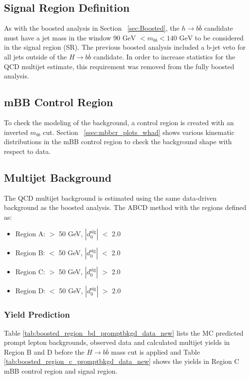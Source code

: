 \subsection{Signal Region Definition}
As with the boosted analysis in Section ~\ref{sec:Boosted}, the ${h\rightarrow b\overline{b}}$ candidate must have a jet mass in the window ${90 \text{ GeV } < m_{bb} < 140 \text{ GeV}}$ to be considered in the signal region (SR). The previous boosted analysis included a b-jet veto for all jets outside of the ${H\rightarrow b\overline{b}}$ candidate. In order to increase statistics for the QCD multijet estimate, this requirement was removed from the fully boosted analysis.

\subsection{mBB Control Region}
To check the modeling of the background, a control region is created with an inverted ${m_{bb}}$ cut. Section ~\ref{ssec:mbbcr_plots_whad} shows various kinematic distributions in  the mBB control region to check the background shape with respect to data.
\subsection{Multijet Background}
The QCD multijet background is estimated using the same data-driven background as the boosted analysis. The ABCD method with the regions defined as:
\begin{itemize}
\item Region A: \met $>$ 50 GeV, $|d_{0}^{\textrm{sig}}|$ $<$ 2.0
\item Region B: \met $<$ 50 GeV, $|d_{0}^{\textrm{sig}}|$ $<$ 2.0
\item Region C: \met $>$ 50 GeV, $|d_{0}^{\textrm{sig}}|$ $>$ 2.0
\item Region D: \met $<$ 50 GeV, $|d_{0}^{\textrm{sig}}|$ $>$ 2.0
\end{itemize}

\subsubsection{Yield Prediction}
Table \ref{tab:boosted_region_bd_promptbkgd_data_new} lists the MC predicted prompt lepton backgrounds, observed data and calculated multijet yields in Region B and D before the ${H\rightarrow b\overline{b}}$ mass cut is applied and Table \ref{tab:boosted_region_c_promptbkgd_data_new} shows the yields in Region C mBB control region and signal region.\newline

